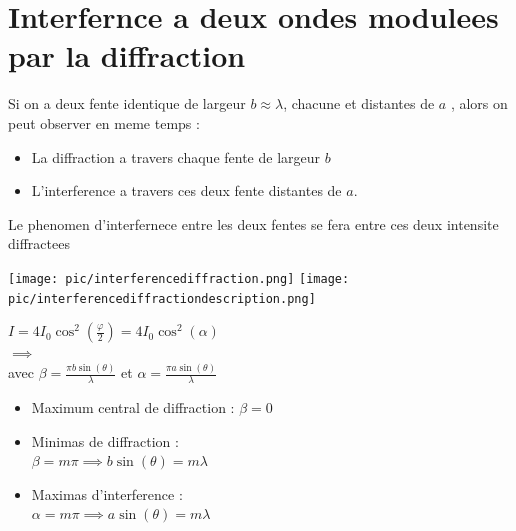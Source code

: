 \documentclass[12pt]{book}
\begin{document}
        \section{Interfernce a deux ondes modulees par la diffraction}
            Si on a deux fente identique de largeur $b \approx \lambda$, chacune et distantes de $a$ , alors on peut observer en meme temps :
            \begin{itemize}
                \item La diffraction a travers chaque fente de largeur $b$
                \item L'interference a travers ces deux fente distantes de $a$.
            \end{itemize}
            Le phenomen d'interfernece entre les deux fentes se fera entre ces deux intensite diffractees \\ 
           
            \begin{center}
                \begin{minipage}{0.5\linewidth}
                    \texttt{[image: pic/interferencediffraction.png]}
                    \texttt{[image: pic/interferencediffractiondescription.png]}
                \end{minipage}
                \begin{minipage}{0.49\linewidth}
                    $ I = 4I_0\cos^2(\frac{\varphi}{2})=4I_0\cos^2(\alpha) $\\
                    $\implies$\\
                    avec $\beta = \frac{\pi b \sin(\theta)}{\lambda}$ et $ \alpha = \frac{\pi a \sin(\theta)}{\lambda} $ 
                    \begin{itemize}
                        \item Maximum central de diffraction : $\beta = 0$
                        \item Minimas de diffraction : \\$\beta   =m\pi \implies b\sin(\theta)=m\lambda$
                        \item Maximas d'interference : \\$\alpha = m\pi \implies a\sin(\theta)=m\lambda$
                    \end{itemize}
                \end{minipage}
            \end{center}
        \pagebreak
\end{document}
